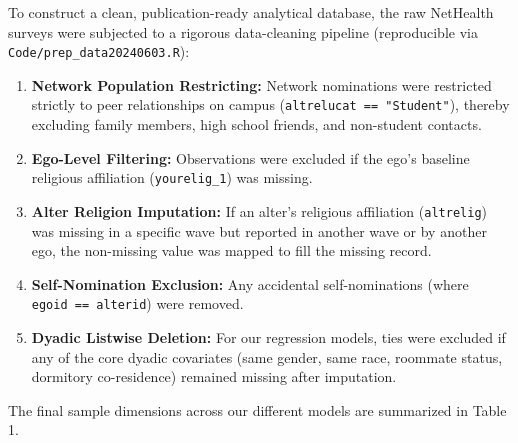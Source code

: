 \documentclass[
  letterpaper,
  DIV=11,
  numbers=noendperiod]{scrartcl}
\providecommand{\tightlist}{%
  \setlength{\itemsep}{0pt}\setlength{\parskip}{0pt}}
\begin{document}
To construct a clean, publication-ready analytical database, the raw
NetHealth surveys were subjected to a rigorous data-cleaning pipeline
(reproducible via \texttt{Code/prep\_data20240603.R}):

\begin{enumerate}
\def\labelenumi{\arabic{enumi}.}
\tightlist
\item
  \textbf{Network Population Restricting:} Network nominations were
  restricted strictly to peer relationships on campus
  (\texttt{altrelucat\ ==\ "Student"}), thereby excluding family
  members, high school friends, and non-student contacts.
\item
  \textbf{Ego-Level Filtering:} Observations were excluded if the ego's
  baseline religious affiliation (\texttt{yourelig\_1}) was missing.
\item
  \textbf{Alter Religion Imputation:} If an alter's religious
  affiliation (\texttt{altrelig}) was missing in a specific wave but
  reported in another wave or by another ego, the non-missing value was
  mapped to fill the missing record.
\item
  \textbf{Self-Nomination Exclusion:} Any accidental self-nominations
  (where \texttt{egoid\ ==\ alterid}) were removed.
\item
  \textbf{Dyadic Listwise Deletion:} For our regression models, ties
  were excluded if any of the core dyadic covariates (same gender, same
  race, roommate status, dormitory co-residence) remained missing after
  imputation.
\end{enumerate}

The final sample dimensions across our different models are summarized
in Table 1.
\end{document}
